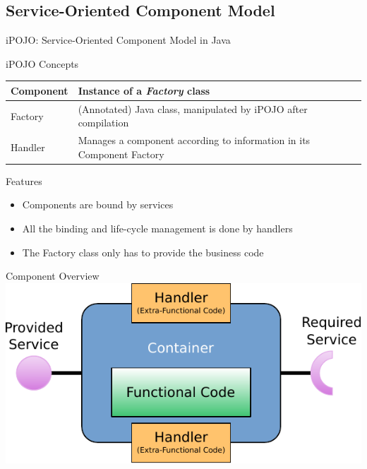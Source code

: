 \subsection{Service-Oriented Component Model}

\begin{frame}{iPOJO: Service-Oriented Component Model in Java}
\begin{block}{iPOJO Concepts}
\begin{tabular}{lp{}}
Component & Instance of a \textit{Factory} class\\
\hline
Factory & (Annotated) Java class, manipulated by iPOJO after compilation\\
\hline
Handler & Manages a component according to information in its Component Factory\\
\end{tabular}
\end{block}

\begin{block}{Features}
\begin{itemize}
\item Components are bound by services
\item All the binding and life-cycle management is done by handlers
\item The Factory class only has to provide the business code
\end{itemize}
\end{block}
\end{frame}

\begin{frame}{Component Overview}
\centering
\includegraphics[width=\textwidth]{../imgs/cbse_component}
\end{frame}

